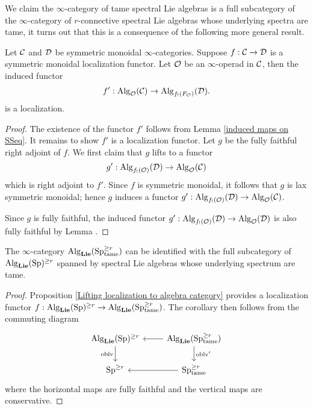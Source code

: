 We claim the $\infty$-category of tame spectral Lie algebras is a full subcategory of the $\infty$-category of $r$-connective spectral Lie algebras whose underlying spectra are tame, it turns out that this is a consequence of the following more general result.
\begin{proposition}
\label{Lifting localization to algebra category}
Let ${\mathcal{C}}$ and ${\mathcal{D}}$ be symmetric monoidal $\infty$-categories. 
Suppose $f:{\mathcal{C}} \to {\mathcal{D}}$ is a symmetric monoidal localization functor.
Let ${\mathcal{O}}$ be an $\infty$-operad in ${\mathcal{C}}$, then the induced functor
$$
f' : \operatorname{Alg}_{{\mathcal{O}}}({\mathcal{C}}) \to \operatorname{Alg}_{f_{!}(F_{\mathcal{O}})}({\mathcal{D}}).
$$
is a localization.
\end{proposition}
\begin{proof}
	The existence of the functor $f'$ follows from Lemma \ref{induced maps on SSeq}. It remains to show $f'$ is a localization functor. Let $g$ be the fully faithful right adjoint of $f$. We first claim that $g$ lifts to a functor 
	$$
	g': \operatorname{Alg}_{f_{!}({\mathcal{O}})}({\mathcal{D}})
	\to 
	\operatorname{Alg}_{{\mathcal{O}}}({\mathcal{C}})
	$$
	which is right adjoint to $f'$. 
	Since $f$ is symmetric monoidal, it follows that $g$ is lax symmetric monoidal; hence $g$ induces a functor $g': \operatorname{Alg}_{f_{!}({\mathcal{O}})}({\mathcal{D}})
	\to 
	\operatorname{Alg}_{{\mathcal{O}}}({\mathcal{C}})$.
	
	Since $g$ is fully faithful, the induced functor $g':\operatorname{Alg}_{f_{!}({\mathcal{O}})}({\mathcal{D}})
	\to
	\operatorname{Alg}_{{\mathcal{O}}}({\mathcal{D}})$ is also fully faithful by Lemma .  
\end{proof}

\begin{corollary}
\label{Identification of tame Lie algebras}
	The $\infty$-category $\operatorname{Alg}_{\mathbf{Lie}}(\operatorname{Sp}^{\geq r}_{\operatorname{\operatorname{tame}}})$ can be identified with the full subcategory of $\operatorname{Alg}_{\mathbf{Lie}}(\operatorname{Sp})^{\geq r}$ spanned by spectral Lie algebras whose underlying spectrum are tame.
\end{corollary}
\begin{proof}
    Proposition \ref{Lifting localization to algebra category} provides a localization functor
	$f: \operatorname{Alg}_{\mathbf{Lie}}(\operatorname{Sp})^{\geq r} \to \operatorname{Alg}_{\mathbf{Lie}}(\operatorname{Sp}^{\geq r}_{\operatorname{\operatorname{tame}}})$. The corollary then follows from the commuting diagram
\[
\begin{tikzcd}
	\Alg_{\spLie}(\Sp)^{\geq r} & \Alg_{\spLie}(\Sp^{\geq r}_{\tame})\\
	\Sp^{\geq r}  & 
	\Sp^{\geq r}_{\tame}
	\arrow[from=1-2, to= 1-1]
	\arrow[from=1-1, to=2-1, "\oblv" left]
	\arrow[from=1-2, to=2-2, "\oblv'" ]
	\arrow[from=2-2, to= 2-1]
\end{tikzcd}
\]
where the horizontal maps are fully faithful and the vertical maps are conservative. 

\end{proof}


